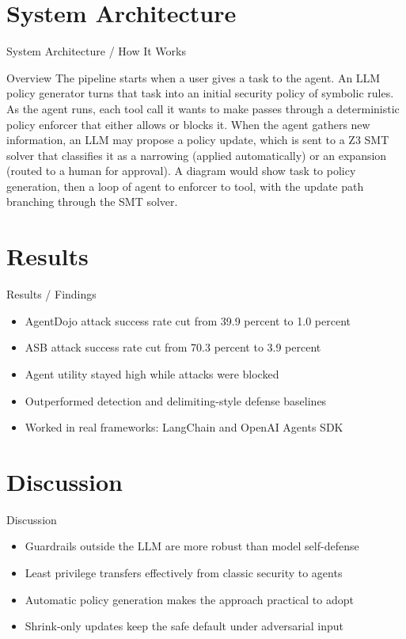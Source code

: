 \documentclass[10pt]{beamer}
\begin{document}
\section{System Architecture}
\begin{frame}{System Architecture / How It Works}
  \begin{block}{Overview}
  The pipeline starts when a user gives a task to the agent. An LLM policy generator turns that task into an initial security policy of symbolic rules. As the agent runs, each tool call it wants to make passes through a deterministic policy enforcer that either allows or blocks it. When the agent gathers new information, an LLM may propose a policy update, which is sent to a Z3 SMT solver that classifies it as a narrowing (applied automatically) or an expansion (routed to a human for approval). A diagram would show task to policy generation, then a loop of agent to enforcer to tool, with the update path branching through the SMT solver.
  \end{block}
\end{frame}

\section{Results}
\begin{frame}[allowframebreaks]{Results / Findings}
\begin{itemize}
  \item AgentDojo attack success rate cut from 39.9 percent to 1.0 percent
  \item ASB attack success rate cut from 70.3 percent to 3.9 percent
  \item Agent utility stayed high while attacks were blocked
  \item Outperformed detection and delimiting-style defense baselines
  \item Worked in real frameworks: LangChain and OpenAI Agents SDK
\end{itemize}
\end{frame}

\section{Discussion}
\begin{frame}{Discussion}
\begin{itemize}
  \item Guardrails outside the LLM are more robust than model self-defense
  \item Least privilege transfers effectively from classic security to agents
  \item Automatic policy generation makes the approach practical to adopt
  \item Shrink-only updates keep the safe default under adversarial input
\end{itemize}
\end{frame}
\end{document}

